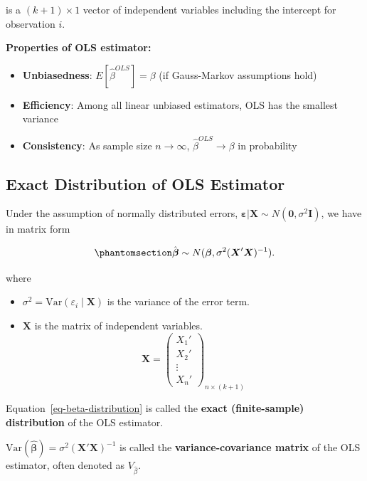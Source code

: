\documentclass[
  12pt,
  letterpaper,
]{scrbook}
\providecommand{\tightlist}{%
  \setlength{\itemsep}{0pt}\setlength{\parskip}{0pt}}
\renewcommand{\tightlist}{\setlength{\itemsep}{0.5\baselineskip}\setlength{\parskip}{0.2\baselineskip}}
\newcommand{\bX}{\boldsymbol{X}}
\newcommand{\bbeta}{\boldsymbol{\beta}}
\newcommand{\var}{\mathrm{Var}}
\theoremstyle{definition}
\theoremstyle{plain}
\theoremstyle{remark}
\begin{document}
is a \((k+1) \times 1\) vector of independent variables including the
intercept for observation \(i\).

\textbf{Properties of OLS estimator:}

\begin{itemize}
\tightlist
\item
  \textbf{Unbiasedness}: \(E[\hat{\beta}^{OLS}] = \beta\) (if
  Gauss-Markov assumptions hold)
\item
  \textbf{Efficiency}: Among all linear unbiased estimators, OLS has the
  smallest variance
\item
  \textbf{Consistency}: As sample size \(n \to \infty\),
  \(\hat{\beta}^{OLS} \to \beta\) in probability
\end{itemize}

\subsection{Exact Distribution of OLS
Estimator}\label{exact-distribution-of-ols-estimator}

Under the assumption of normally distributed errors,
\(\boldsymbol{\varepsilon} \vert \boldsymbol{X} \sim N(\boldsymbol{0}, \sigma^2\boldsymbol{I})\),
we have in matrix form

\begin{equation}\phantomsection\label{eq-beta-distribution}{
\hat{\boldsymbol{\beta}} \sim N(\boldsymbol{\beta}, \sigma^2 (\boldsymbol{X}'\boldsymbol{X})^{-1}).
}\end{equation}

where

\begin{itemize}
\tightlist
\item
  \(\sigma^2 = \var (\varepsilon_i \mid \bX)\) is the variance of the
  error term.
\item
  \(\bX\) is the matrix of independent variables. \[
  \bX = \begin{pmatrix}
     X_1' \\ X_2' \\ \vdots \\ X_n'
  \end{pmatrix}_{n \times (k+1)}
  \]
\end{itemize}

Equation~\ref{eq-beta-distribution} is called the \textbf{exact
(finite-sample) distribution} of the OLS estimator.

\(\var(\hat{\bbeta}) = \sigma^2 (\boldsymbol{X}'\boldsymbol{X})^{-1}\)
is called the \textbf{variance-covariance matrix} of the OLS estimator,
often denoted as \(V_{\hat\beta}.\)
\end{document}
